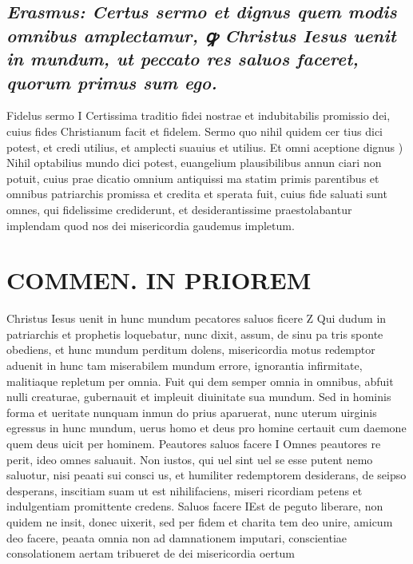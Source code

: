 \documentclass{article}
\begin{document}
\begin{pages}
\subsection*{\textit{Erasmus: Certus sermo et dignus quem modis omnibus amplectamur, ꝙ Christus Iesus uenit in mundum, ut peccato res saluos faceret, quorum primus sum ego. }}\pstart Fidelus sermo I Certissima traditio fidei nostrae et indubitabilis promissio dei, cuius fides Christianum facit et fidelem. Sermo quo nihil quidem cer tius dici potest, et credi utilius, et amplecti suauius et utilius.  \pend\pstart Et omni aceptione dignus ) Nihil optabilius mundo dici potest, euangelium plausibilibus annun ciari non potuit, cuius prae dicatio omnium antiquissi ma statim primis parentibus et omnibus patriarchis promissa et credita et sperata fuit, cuius fide saluati sunt omnes, qui fidelissime crediderunt, et desiderantissime praestolabantur implendam quod nos dei misericordia gaudemus impletum.  \pend
\section*{COMMEN. IN PRIOREM }
\marginpar{[ p.32 ]}\pstart Christus Iesus uenit in hunc mundum pecatores saluos ficere Z Qui dudum in patriarchis et prophetis loquebatur, nunc dixit, assum, de sinu pa tris sponte obediens, et hunc mundum perditum dolens, misericordia motus redemptor aduenit in hunc tam miserabilem mundum errore, ignorantia infirmitate, malitiaque repletum per omnia. Fuit qui dem semper omnia in omnibus, abfuit nulli creaturae, gubernauit et impleuit diuinitate sua mundum. Sed in hominis forma et ueritate nunquam inmun do prius aparuerat, nunc uterum uirginis egressus in hunc mundum, uerus homo et deus pro homine certauit cum daemone quem deus uicit per hominem.  \pend\pstart Peautores saluos facere I Omnes peautores re perit, ideo omnes saluauit. Non iustos, qui uel sint uel se esse putent nemo saluotur, nisi peaati sui consci us, et humiliter redemptorem desiderans, de seipso desperans, inscitiam suam ut est nihilifaciens, miseri ricordiam petens et indulgentiam promittente credens.  \pend\pstart Saluos facere IEst de peguto liberare, non quidem ne insit, donec uixerit, sed per fidem et charita tem deo unire, amicum deo facere, peaata omnia non ad damnationem imputari, conscientiae consolationem aertam tribueret de dei misericordia oertum  \pend

\end{pages}
\end{document}
